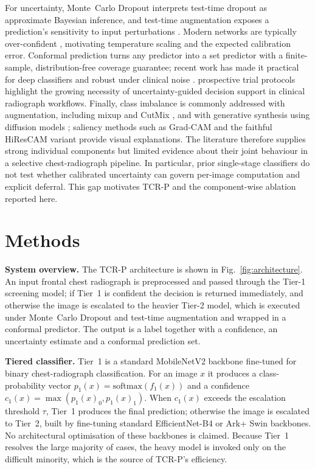 \documentclass[pdflatex,sn-nature]{sn-jnl}
\begin{document}
For uncertainty, Monte~Carlo Dropout \cite{gal2016dropout} interprets test-time dropout as approximate Bayesian inference, and test-time augmentation exposes a prediction's sensitivity to input perturbations \cite{wang2019aleatoric}. Modern networks are typically over-confident \cite{guo2017calibration}, motivating temperature scaling and the expected calibration error. Conformal prediction \cite{vovk2005algorithmic, shafer2008tutorial} turns any predictor into a set predictor with a finite-sample, distribution-free coverage guarantee; recent work has made it practical for deep classifiers \cite{romano2020classification, angelopoulos2021uncertainty, angelopoulos2023gentle} and robust under clinical noise \cite{penso2025conformal}. prospective trial protocols \cite{jmir2026luana} highlight the growing necessity of uncertainty-guided decision support in clinical radiograph workflows. Finally, class imbalance is commonly addressed with augmentation, including mixup \cite{zhang2018mixup} and CutMix \cite{yun2019cutmix}, and with generative synthesis using diffusion models \cite{rombach2022high}; saliency methods such as Grad-CAM \cite{selvaraju2017gradcam} and the faithful HiResCAM variant \cite{draelos2020hirescam} provide visual explanations. The literature therefore supplies strong individual components but limited evidence about their joint behaviour in a selective chest-radiograph pipeline. In particular, prior single-stage classifiers do not test whether calibrated uncertainty can govern per-image computation and explicit deferral. This gap motivates TCR-P and the component-wise ablation reported here.

\section{Methods}\label{sec:methods}

\textbf{System overview.} The TCR-P architecture is shown in Fig.~\ref{fig:architecture}. An input frontal chest radiograph is preprocessed and passed through the Tier-1 screening model; if Tier~1 is confident the decision is returned immediately, and otherwise the image is escalated to the heavier Tier-2 model, which is executed under Monte~Carlo Dropout and test-time augmentation and wrapped in a conformal predictor. The output is a label together with a confidence, an uncertainty estimate and a conformal prediction set.

\textbf{Tiered classifier.} Tier~1 is a standard MobileNetV2 backbone \cite{sandler2018mobilenetv2} fine-tuned for binary chest-radiograph classification. For an image $x$ it produces a class-probability vector $p_1(x)=\mathrm{softmax}(f_1(x))$ and a confidence $c_1(x)=\max(p_1(x)_0, p_1(x)_1)$. When $c_1(x)$ exceeds the escalation threshold $\tau$, Tier~1 produces the final prediction; otherwise the image is escalated to Tier~2, built by fine-tuning standard EfficientNet-B4 \cite{tan2019efficientnet} or Ark+ Swin \cite{ma2025arkplus, liu2021swin} backbones. No architectural optimisation of these backbones is claimed. Because Tier~1 resolves the large majority of cases, the heavy model is invoked only on the difficult minority, which is the source of TCR-P's efficiency.
\end{document}
